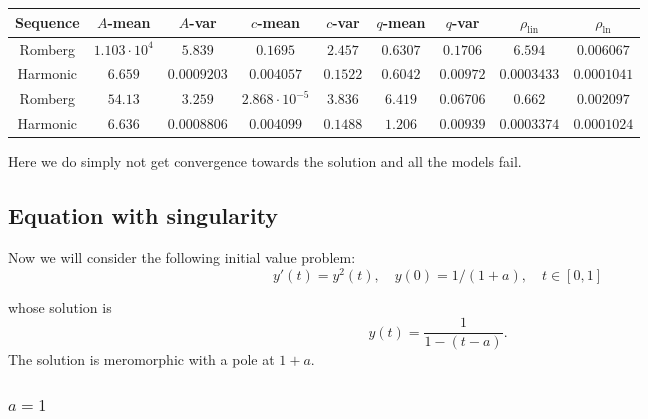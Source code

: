 \begin{table}[H]
    \centering
    \small
    \begin{tabular}{c||c|c|c|c|c|c|c|c}
Sequence & \(A\)-mean & \(A\)-var & \(c\)-mean & \(c\)-var & \(q\)-mean & \(q\)-var & \(\rho_{\operatorname{lin}}\) & \(\rho_{\ln}\)\\\hline
\rowcolor{red}
Romberg & \(1.103\cdot 10^4\) & \(5.839\) & \(0.1695\) & \(2.457\) & \(0.6307\) & \(0.1706\) & \(6.594\) & \(0.006067\) \\
\rowcolor{red}
Harmonic & \(6.659\) & \(0.0009203\) & \(0.004057\) & \(0.1522\) & \(0.6042\) & \(0.00972\) & \(0.0003433\) & \(0.0001041\) \\
\rowcolor{red}
Romberg & \(54.13\) & \(3.259\) & \(2.868\cdot 10^{-5}\) & \(3.836\) & \(6.419\) & \(0.06706\) & \(0.662\) & \(0.002097\) \\
\rowcolor{red}
Harmonic & \(6.636\) & \(0.0008806\) & \(0.004099\) & \(0.1488\) & \(1.206\) & \(0.00939\) & \(0.0003374\) & \(0.0001024\) \\
    \end{tabular}
    \label{tab:my_label}
\end{table}

Here we do simply not get convergence towards the solution and all the models fail.

\subsection{Equation with singularity}

Now we will consider the following initial value problem:
\begin{equation}\label{46}
y'(t) = y^2(t),\quad y(0) = 1/(1+a), \quad t\in [0,1]
\end{equation}

whose solution is 
\[
y(t) = \frac{1}{1-(t-a)}.
\]
The solution is meromorphic with a pole at \(1+a\).

\subsubsection{\(a = 1\)}

